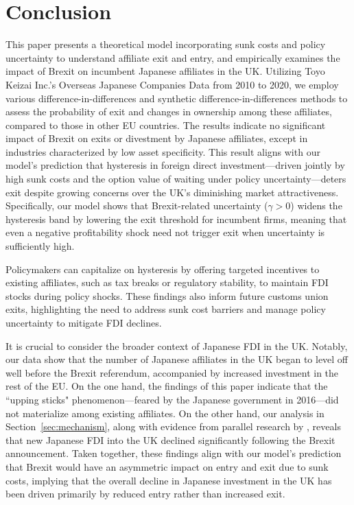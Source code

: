 \documentclass[preprint,11pt,authoryear]{elsarticle}
\begin{document}
\section{Conclusion\label{sec:conclusion}}

This paper presents a theoretical model incorporating sunk costs and policy uncertainty to understand affiliate exit and entry, and empirically examines the impact of Brexit on incumbent Japanese affiliates in the UK. Utilizing Toyo Keizai Inc.’s Overseas Japanese Companies Data from 2010 to 2020, we employ various difference-in-differences and synthetic difference-in-differences methods to assess the probability of exit and changes in ownership among these affiliates, compared to those in other EU countries. The results indicate no significant impact of Brexit on exits or divestment by Japanese affiliates, except in industries characterized by low asset specificity. This result aligns with our model’s prediction that hysteresis in foreign direct investment---driven jointly by high sunk costs and the option value of waiting under policy uncertainty---deters exit despite growing concerns over the UK’s diminishing market attractiveness. Specifically, our model shows that Brexit-related uncertainty ($\gamma > 0$) widens the hysteresis band by lowering the exit threshold for incumbent firms, meaning that even a negative profitability shock need not trigger exit when uncertainty is sufficiently high.

Policymakers can capitalize on hysteresis by offering targeted incentives to existing affiliates, such as tax breaks or regulatory stability, to maintain FDI stocks during policy shocks. These findings also inform future customs union exits, highlighting the need to address sunk cost barriers and manage policy uncertainty to mitigate FDI declines.

It is crucial to consider the broader context of Japanese FDI in the UK. Notably, our data show that the number of Japanese affiliates in the UK began to level off well before the Brexit referendum, accompanied by increased investment in the rest of the EU. On the one hand, the findings of this paper indicate that the ``upping sticks" phenomenon—feared by the Japanese government in 2016—did not materialize among existing affiliates. On the other hand, our analysis in Section~\ref{sec:mechanism}, along with evidence from parallel research by \cite{cieslik2022brexit}, reveals that new Japanese FDI into the UK declined significantly following the Brexit announcement. Taken together, these findings align with our model’s prediction that Brexit would have an asymmetric impact on entry and exit due to sunk costs, implying that the overall decline in Japanese investment in the UK has been driven primarily by reduced entry rather than increased exit.
\end{document}
